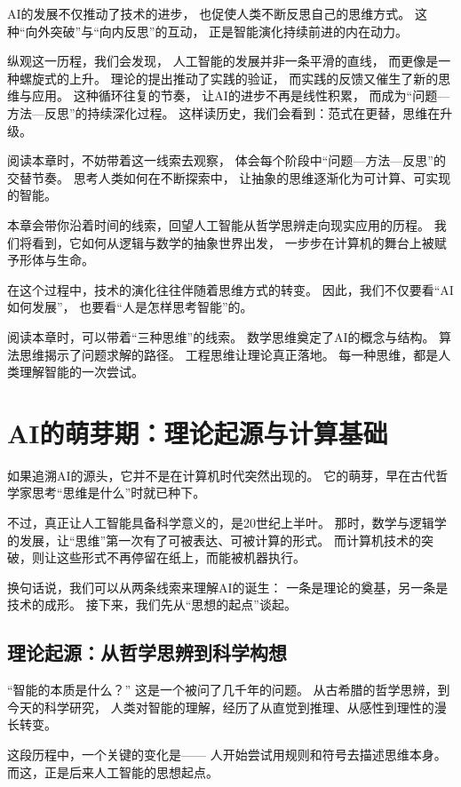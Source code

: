AI的发展不仅推动了技术的进步，
也促使人类不断反思自己的思维方式。
这种“向外突破”与“向内反思”的互动，
正是智能演化持续前进的内在动力。

纵观这一历程，我们会发现，
人工智能的发展并非一条平滑的直线，
而更像是一种螺旋式的上升。
理论的提出推动了实践的验证，
而实践的反馈又催生了新的思维与应用。
这种循环往复的节奏，
让AI的进步不再是线性积累，
而成为“问题—方法—反思”的持续深化过程。
这样读历史，我们会看到：范式在更替，思维在升级。

阅读本章时，不妨带着这一线索去观察，
体会每个阶段中“问题—方法—反思”的交替节奏。
思考人类如何在不断探索中，
让抽象的思维逐渐化为可计算、可实现的智能。

本章会带你沿着时间的线索，回望人工智能从哲学思辨走向现实应用的历程。
我们将看到，它如何从逻辑与数学的抽象世界出发，
一步步在计算机的舞台上被赋予形体与生命。

在这个过程中，技术的演化往往伴随着思维方式的转变。
因此，我们不仅要看“AI如何发展”，
也要看“人是怎样思考智能”的。

阅读本章时，可以带着“三种思维”的线索。
数学思维奠定了AI的概念与结构。
算法思维揭示了问题求解的路径。
工程思维让理论真正落地。
每一种思维，都是人类理解智能的一次尝试。

\section{AI的萌芽期：理论起源与计算基础}

如果追溯AI的源头，它并不是在计算机时代突然出现的。
它的萌芽，早在古代哲学家思考“思维是什么”时就已种下。

不过，真正让人工智能具备科学意义的，是20世纪上半叶。
那时，数学与逻辑学的发展，让“思维”第一次有了可被表达、可被计算的形式。
而计算机技术的突破，则让这些形式不再停留在纸上，而能被机器执行。

换句话说，我们可以从两条线索来理解AI的诞生：
一条是理论的奠基，另一条是技术的成形。
接下来，我们先从“思想的起点”谈起。

\subsection{理论起源：从哲学思辨到科学构想}

“智能的本质是什么？”
这是一个被问了几千年的问题。
从古希腊的哲学思辨，到今天的科学研究，
人类对智能的理解，经历了从直觉到推理、从感性到理性的漫长转变。

这段历程中，一个关键的变化是——
人开始尝试用规则和符号去描述思维本身。
而这，正是后来人工智能的思想起点。

